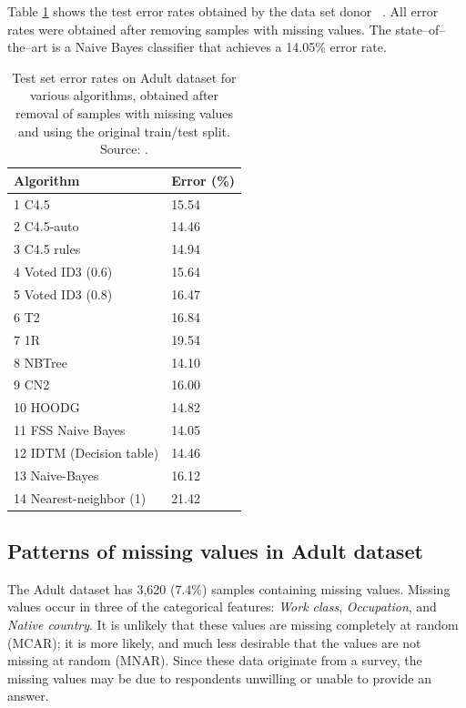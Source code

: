 \documentclass[10pt,twocolumn,letterpaper]{article}
\begin{document}
Table \ref{tab:benchmarks} shows the test error rates obtained by the data set donor ~\cite{kohavi1996}. All error rates were obtained after removing samples with missing values. The state--of--the--art is a Naive Bayes classifier that achieves a  14.05\% error rate. \\

\begin{table}[htb]
\centering
\begin{tabular}{@{}ll@{}}
\toprule
\textbf{Algorithm}       & \textbf{Error (\%)} \\ \midrule
1  C4.5                  & 15.54          \\
2  C4.5-auto             & 14.46          \\
3  C4.5 rules            & 14.94          \\
4  Voted ID3 (0.6)       & 15.64          \\
5  Voted ID3 (0.8)       & 16.47          \\
6  T2                    & 16.84          \\
7  1R                    & 19.54          \\
8  NBTree                & 14.10          \\
9  CN2                   & 16.00          \\
10 HOODG                 & 14.82          \\
      \rowcolor{Gray}
11 FSS Naive Bayes       & 14.05          \\
12 IDTM (Decision table) & 14.46          \\
13 Naive-Bayes           & 16.12          \\
14 Nearest-neighbor (1)  & 21.42          \\ \bottomrule
\end{tabular}
\caption{Test set error rates on Adult dataset for various algorithms, obtained after removal of samples with missing values and using the original train/test split. Source: \cite{Lichman2013}.}
\label{tab:benchmarks}
\end{table}

\subsection{Patterns of missing values in Adult dataset}

The Adult dataset has 3,620 (7.4\%) samples containing missing values. Missing values occur in three of the categorical features: \textit{Work class}, \textit{Occupation}, and \textit{Native country}. It is unlikely that these values are missing completely at random (MCAR); it is more likely, and much less desirable that the values are not missing at random (MNAR). Since these data originate from a survey, the missing values may be due to respondents unwilling or unable to provide an answer.  \\
\end{document}
